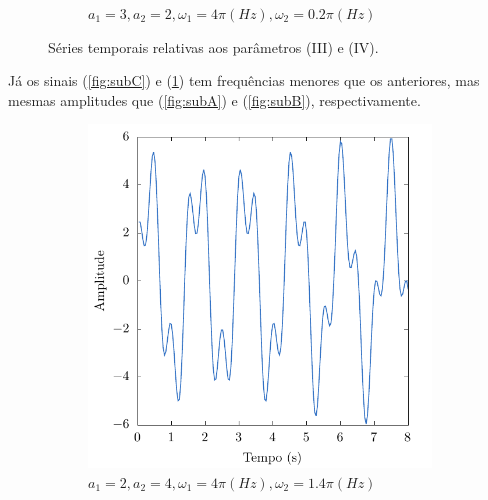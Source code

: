 \documentclass[a4paper, 11pt]{article}
\begin{document}
\begin{figure}[h!]
\begin{subfigure}{0.45\textwidth}
        \caption{\(a_1 = 3, a_2 = 2, \omega_1 = 4\pi(Hz), \omega_2 = 0.2\pi (Hz)\)}
        \label{fig:subD}
    \end{subfigure}
    \caption{Séries temporais relativas aos parâmetros (III) e (IV).}
    \label{fig:sinais_2}
\end{figure}

Já os sinais (\ref{fig:subC}) e (\ref{fig:subD}) tem frequências menores que os anteriores, mas
mesmas amplitudes que (\ref{fig:subA}) e (\ref{fig:subB}), respectivamente.

\begin{figure}[h!]
  \centering
    \begin{subfigure}{0.45\textwidth}
        \includegraphics[width=\textwidth]{signal-E}
        \caption{\(a_1 = 2, a_2 = 4, \omega_1 = 4\pi(Hz), \omega_2 = 1.4\pi (Hz)\)}
        \label{fig:subE}
    \end{subfigure}
    \begin{subfigure}{0.45\textwidth}

\end{subfigure}
\end{figure}
\end{document}
